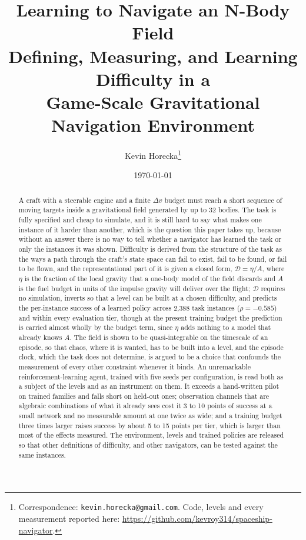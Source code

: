 \documentclass[11pt]{article}
\title{\bf Learning to Navigate an N-Body Field\\[2pt]
\large Defining, Measuring, and Learning Difficulty in a\\
Game-Scale Gravitational Navigation Environment}
\author{Kevin Horecka\thanks{Correspondence: \texttt{kevin.horecka@gmail.com}.
Code, levels and every measurement reported here:
\url{https://github.com/kevroy314/spaceship-navigator}.}}
\date{\today}
\newcommand{\dd}{\mathcal{D}}
\begin{document}
\maketitle

\begin{abstract}
A craft with a steerable engine and a finite $\Delta v$ budget must reach a
short sequence of moving targets inside a gravitational field generated by
up to 32 bodies. The task is fully specified and cheap to simulate, and it
is still hard to say what makes one instance of it harder than another,
which is the question this paper takes up, because without an answer there
is no way to tell whether a navigator has learned the task or only the
instances it was shown. Difficulty is derived from the structure of the
task as the ways a path through the craft's state space can fail to exist,
fail to be found, or fail to be flown, and the representational part of it
is given a closed form, $\dd = \eta/A$, where $\eta$ is the fraction of the
local gravity that a one-body model of the field discards and $A$ is the
fuel budget in units of the impulse gravity will deliver over the flight;
$\dd$ requires no simulation, inverts so that a level can be built at a
chosen difficulty, and predicts the per-instance success of a learned
policy across 2,388 task instances ($\rho = -0.585$) and within every
evaluation tier, though at the present training budget the prediction is
carried almost wholly by the budget term, since $\eta$ adds nothing to a
model that already knows $A$. The field is shown to be quasi-integrable on
the timescale of an episode, so that chaos, where it is wanted, has to be
built into a level, and the episode clock, which the task does not
determine, is argued to be a choice that confounds the measurement of every
other constraint whenever it binds. An unremarkable reinforcement-learning
agent, trained with five seeds per configuration, is read both as a subject
of the levels and as an instrument on them. It exceeds a hand-written pilot
on trained families and falls short on held-out ones; observation channels
that are algebraic combinations of what it already sees cost it 3 to 10
points of success at a small network and no measurable amount at one twice
as wide; and a training budget three times larger raises success by about
5 to 15 points per tier, which is larger than most of the effects measured.
The environment, levels and trained policies are released so that other
definitions of difficulty, and other navigators, can be tested against the
same instances.
\end{abstract}
\end{document}
